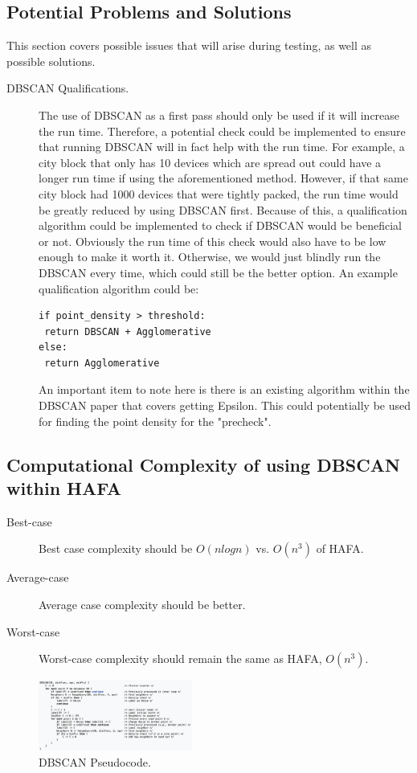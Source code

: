 \documentclass[letterpaper,twocolumn,10pt]{article}
\begin{document}
\subsection{Potential Problems and Solutions}
This section covers possible issues that will arise during testing, as well as possible solutions.
\begin{description}
\item[DBSCAN Qualifications.] The use of DBSCAN as a first pass should only be used if it will increase the run time. Therefore, a potential check could be implemented to ensure that running DBSCAN will in fact help with the run time. For example, a city block that only has 10 devices which are spread out could have a longer run time if using the aforementioned method. However, if that same city block had 1000 devices that were tightly packed, the run time would be greatly reduced by using DBSCAN first. Because of this, a qualification algorithm could be implemented to check if DBSCAN would be beneficial or not. Obviously the run time of this check would also have to be low enough to make it worth it. Otherwise, we would just blindly run the DBSCAN every time, which could still be the better option. An example qualification algorithm could be:
\begin{verbatim}
if point_density > threshold:
 return DBSCAN + Agglomerative
else:
 return Agglomerative
\end{verbatim}
An important item to note here is there is an existing algorithm within the DBSCAN paper that covers getting Epsilon. This could potentially be used for finding the point density for the "precheck".
\end{description}

\subsection{Computational Complexity of using DBSCAN within HAFA}

\begin{description}
\item[Best-case] Best case complexity should be $O (n log n)$ vs. $O(n^3)$ of HAFA.
\item[Average-case] Average case complexity should be better.
\item[Worst-case] Worst-case complexity should remain the same as HAFA, $O(n^3)$.

\end{description}





\begin{figure}[h]
\centering
\includegraphics[width=0.45\textwidth]{pseudocode}
\caption{\label{fig:pseudocode}DBSCAN Pseudocode.}
\end{figure}




\end{document}
